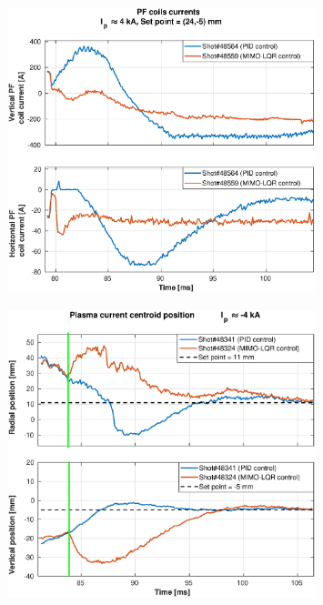 \begin{figure}
	\centering
	\includegraphics[width=0.8\textwidth]{Chp5/PIDvsMIMO_564_559_curr_2.eps}
	\label{564_559curr}
\end{figure}

\begin{figure}
	\centering
	\includegraphics[width=0.8\textwidth]{Chp5/PIDvsMIMO_341_324_2.eps}
	\label{341_342}
\end{figure}

